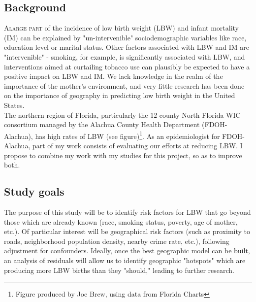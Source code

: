 \documentclass[11pt]{article}
\begin{document}
\begin{multicols}{2} 

\subsection*{Background}

\lettrine[nindent=0em,lines=3]{A}{large part} of the incidence of low birth weight (LBW) and infant mortality (IM) can be explained by "un-intervenible" sociodemographic variables like race, education level or marital status.  Other factors associated with LBW and IM are "intervenible" - smoking, for example, is significantly associated with LBW, and interventions aimed at curtailing tobacco use can plausibly be expected to have a positive impact on LBW and IM.  We lack knowledge in the realm of the importance of the mother's environment, and very little research has been done on the importance of geography in predicting low birth weight in the United States. \cite{Lima2013}   \\

The northern region of Florida, particularly the 12 county North Florida WIC consortium managed by the Alachua County Health Department (FDOH-Alachua), has high rates of LBW (see figure)\footnote{Figure produced by Joe Brew, using data from Florida Charts}.  As an epidemiologist for FDOH-Alachua, part of my work consists of evaluating our efforts at reducing LBW.  I propose to combine my work with my studies for this project, so as to improve both.  

\subsection*{Study goals}
The purpose of this study will be to identify risk factors for LBW that go beyond those which are already known (race, smoking status, poverty, age of mother, etc.).\cite{Vaag2014} \cite{LogginsClay2014}  Of particular interest will be geographical risk factors (such as proximity to roads, neighborhood population density, nearby crime rate, etc.), following adjustment for confounders.  Ideally, once the best geographic model can be built, an analysis of residuals will allow us to identify geographic "hotspots" which are producing more LBW births than they "should," leading to further research.




\end{multicols}
\end{document}
